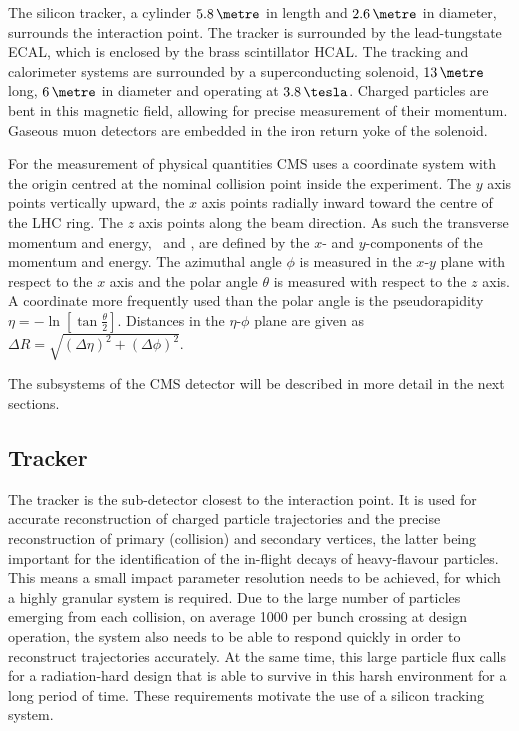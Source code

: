 The silicon tracker, a cylinder $5.8\,\metre$ in length and $2.6\,\metre$ in
diameter, surrounds the interaction point. The tracker is 
surrounded by the lead-tungstate \ac{ECAL}, which is enclosed
by the brass scintillator \ac{HCAL}.
The tracking and calorimeter systems are surrounded by a superconducting
solenoid, $13\,\metre$ long, $6\,\metre$ in diameter and operating at $3.8\,\tesla$.
Charged particles are bent in this magnetic field, allowing for precise 
measurement of their momentum. Gaseous muon detectors are embedded in the 
iron return yoke of the solenoid.

For the measurement of physical quantities \ac{CMS} uses a coordinate
system with the origin centred at the nominal collision point
inside the experiment. The $y$ axis points vertically upward, the $x$ axis
points radially inward toward the centre of the \ac{LHC} ring. The $z$ axis
points along the beam direction. As such the transverse momentum and energy, 
\pT~and \ET, are defined by the $x$- and $y$-components of the momentum and energy.
The azimuthal angle $\phi$ is measured in the $x$-$y$ plane with respect to the $x$ axis  
and the polar angle $\theta$ is measured with respect to the $z$ axis. A coordinate
more frequently used than the polar angle is the pseudorapidity $\eta = -\ln{[\tan{\frac{\theta}{2}}]}$.%
Distances in the $\eta$-$\phi$ plane are given as $\Delta R = \sqrt{(\Delta\eta)^2+(\Delta\phi)^2}$. 

The subsystems of the \ac{CMS} detector will be described in more detail in the 
next sections.

\subsection{Tracker}
\label{sec:CMSLHC_CMS_tracker}
The tracker \cite{cms-jinst} is the sub-detector closest to the interaction point. It
is used for accurate reconstruction of charged particle trajectories and 
the precise reconstruction of primary (collision) and secondary vertices, the latter being important for
the identification of the in-flight decays of heavy-flavour particles. This means a small impact parameter
resolution needs to be achieved, for which a highly granular system is required. 
Due to the large number of particles emerging from 
each collision, on average 1000 per bunch crossing at design operation, the 
system also needs to be able to respond quickly in order to reconstruct trajectories accurately.
At the same time, this large particle flux calls for a 
radiation-hard design that is able to survive in this harsh environment
for a long period of time. These requirements motivate the use of a silicon tracking
system. 

